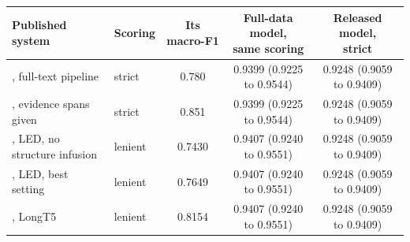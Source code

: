 \begin{tabular}{>{\raggedright\arraybackslash}p{6.0cm}lccc}
\toprule
Published system & Scoring & Its macro-F1 & \shortstack{Full-data model,\\ same scoring} & \shortstack{Released model,\\ strict} \\
\midrule
\citet{deyoung2020}, full-text pipeline & strict & 0.780 & 0.9399 {\scriptsize (0.9225 to 0.9544)} & 0.9248 {\scriptsize (0.9059 to 0.9409)} \\[1pt]
\citet{deyoung2020}, evidence spans given & strict & 0.851 & 0.9399 {\scriptsize (0.9225 to 0.9544)} & 0.9248 {\scriptsize (0.9059 to 0.9409)} \\[1pt]
\citet{buchmann2024structure}, LED, no structure infusion & lenient & 0.7430 & 0.9407 {\scriptsize (0.9240 to 0.9551)} & 0.9248 {\scriptsize (0.9059 to 0.9409)} \\[1pt]
\citet{buchmann2024structure}, LED, best setting & lenient & 0.7649 & 0.9407 {\scriptsize (0.9240 to 0.9551)} & 0.9248 {\scriptsize (0.9059 to 0.9409)} \\[1pt]
\citet{buchmann2024structure}, LongT5 & lenient & 0.8154 & 0.9407 {\scriptsize (0.9240 to 0.9551)} & 0.9248 {\scriptsize (0.9059 to 0.9409)} \\[1pt]
\bottomrule
\end{tabular}

